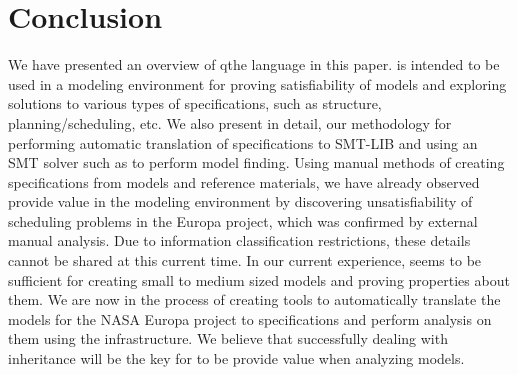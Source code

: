 
\section{Conclusion}
\label{sec:conclusion}

We have presented an overview of qthe \Klang{} language in this
paper. \Klang{} is intended to be used in a modeling environment for
proving satisfiability of \sysml{} models and exploring solutions to
various types of specifications, such as structure,
planning/scheduling, etc. We also present in detail, our methodology
for performing automatic translation of \Klang{} specifications to
SMT-LIB and using an SMT solver such as \zthree{} to perform model
finding. Using manual methods of creating \Klang{} specifications from
\sysml{} models and reference materials, we have already observed
\Klang{} provide value in the modeling environment by discovering
unsatisfiability of scheduling problems in the Europa project, which
was confirmed by external manual analysis. Due to information
classification restrictions, these details cannot be shared at this
current time. In our current experience, \Klang{} seems to be
sufficient for creating small to medium sized \sysml{} models and
proving properties about them. We are now in the process of creating
tools to automatically translate the \sysml{} models for the NASA
Europa project to \Klang{} specifications and perform analysis on them
using the \Klang{} infrastructure. We believe that successfully
dealing with inheritance will be the key for \Klang{} to be provide
value when analyzing \sysml{} models.

